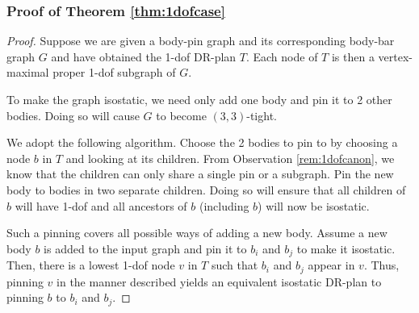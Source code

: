 \subsubsection{Proof of Theorem \ref{thm:1dofcase}}
\begin{proof}
    Suppose we are given a body-pin graph and its corresponding body-bar graph $G$ and have obtained the 1-dof DR-plan $T$. Each node of $T$ is then a vertex-maximal proper 1-dof subgraph of $G$.

    To make the graph isostatic, we need only add one body and pin it to 2 other bodies. Doing so will cause $G$ to become $(3,3)$-tight.

    We adopt the following algorithm. Choose the 2 bodies to pin to by choosing a node $b$ in $T$ and looking at its children. From Observation \ref{rem:1dofcanon}, we know that the children can only share  a single pin or a subgraph. Pin the new body to bodies in two separate children. Doing so will ensure that all children of $b$ will have 1-dof and all ancestors of $b$ (including $b$) will now be isostatic.


    Such a pinning covers all possible ways of adding a new body. Assume a new body $b$ is added to the input  graph and pin it to $b_i$ and $b_j$ to make it isostatic. Then, there is a lowest 1-dof node $v$ in $T$ such that $b_i$ and $b_j$ appear in $v$. Thus, pinning $v$ in the manner described yields an equivalent isostatic DR-plan to pinning $b$ to $b_i$ and $b_j$.


\end{proof}
